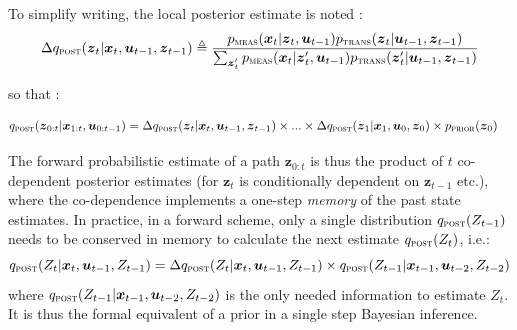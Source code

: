 \documentclass[12pt,twoside,openright]{article}
\begin{document}
To simplify writing, the local posterior estimate is noted :
$$ \Delta q_\text{\sc post}(\boldsymbol{z}_t|\boldsymbol{x}_t,\boldsymbol{u}_{t-1}, \boldsymbol{z}_{t-1}) 
\triangleq \frac{p_\text{\sc meas}(\boldsymbol{x}_t|\boldsymbol{z}_t,\boldsymbol{u}_{t-1}) p_\text{\sc trans}(\boldsymbol{z}_t|\boldsymbol{u}_{t-1},\boldsymbol{z}_{t-1})}
{\sum_{\boldsymbol{z}_t'}p_\text{\sc meas}(\boldsymbol{x}_t|\boldsymbol{z}_t',\boldsymbol{u}_{t-1}) p_\text{\sc trans}(\boldsymbol{z}_t'|\boldsymbol{u}_{t-1},\boldsymbol{z}_{t-1})}
$$

so that :

\begin{align}
q_\text{\sc post}(\boldsymbol{z}_{0:t}|\boldsymbol{x}_{1:t},\boldsymbol{u}_{0:t-1}) 
&= \Delta q_\text{\sc post}(\boldsymbol{z}_t|\boldsymbol{x}_t,\boldsymbol{u}_{t-1}, \boldsymbol{z}_{t-1})  
\times ... \times \Delta q_\text{\sc post}(\boldsymbol{z}_1|\boldsymbol{x}_1,\boldsymbol{u}_0, \boldsymbol{z}_0)  \times  p_\text{\sc prior}(\boldsymbol{z}_0) \nonumber
\end{align}

The forward probabilistic estimate of a path $\boldsymbol{z}_{0:t}$ is thus the product of $t$ co-dependent posterior estimates (for $\boldsymbol{z}_t$ is conditionally dependent on $\boldsymbol{z}_{t-1}$ etc.), where the co-dependence implements a one-step \emph{memory} of the past state estimates. In practice, in a forward scheme, only a single distribution $q_\text{\sc post}(Z_{t-1})$ needs to be conserved in memory to calculate the next estimate $q_\text{\sc post}(Z_t)$, i.e.:
$$q_\text{\sc post}(Z_t|\boldsymbol{x}_t,\boldsymbol{u}_{t-1}, Z_{t-1}) = 
\Delta q_\text{\sc post}(Z_t|\boldsymbol{x}_t,\boldsymbol{u}_{t-1}, Z_{t-1}) 
\times q_\text{\sc post}(Z_{t-1}|\boldsymbol{x}_{t-1},\boldsymbol{u}_{t-2}, Z_{t-2})$$
where $q_\text{\sc post}(Z_{t-1}|\boldsymbol{x}_{t-1},\boldsymbol{u}_{t-2}, Z_{t-2})$ is the only needed information to estimate $Z_t$. It is thus the formal equivalent of a prior in a single step Bayesian inference.
\end{document}
